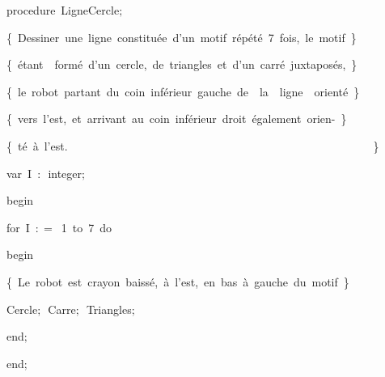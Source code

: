 {\pagebreak[3] 
\vspace{\neglskip}\mbox{\blc  \blk\idt  \mcl procedure\idt \ LigneCercle$;$}\par 
\vspace{\neglskip}\mbox{\blc  \blk\idt  \cmt  \{\ Dessiner\ une\ ligne\ constitu\'{e}e\ d{'}un\ motif\ r\'{e}p\'{e}t\'{e}\ 7\ fois,\ le\ motif\ \}\idt }\par 
\vspace{\neglskip}\mbox{\blc  \blk\idt  \cmt  \{\ \'{e}tant\ \ form\'{e}\ d{'}un\ cercle,\ de\ triangles\ et\ d{'}un\ carr\'{e}\ juxtapos\'{e}s,\ \}\idt }\par 
\vspace{\neglskip}\mbox{\blc  \blk\idt  \cmt  \{\ le\ robot\ partant\ du\ coin\ inf\'{e}rieur\ gauche\ de\ \ la\ \ ligne\ \ orient\'{e}\ \}\idt }\par 
\vspace{\neglskip}\mbox{\blc  \blk\idt  \cmt  \{\ vers\ l{'}est,\ et\ arrivant\ au\ coin\ inf\'{e}rieur\ droit\ \'{e}galement\ orien-\ \}\idt }\par 
\vspace{\neglskip}\mbox{\blc  \blk\idt  \cmt  \{\ t\'{e}\ \`{a}\ l{'}est.\ \ \ \ \ \ \ \ \ \ \ \ \ \ \ \ \ \ \ \ \ \ \ \ \ \ \ \ \ \ \ \ \ \ \ \ \ \ \ \ \ \ \ \ \ \ \ \ \ \ \ \ \ \ \}\idt }\par 
\pagebreak[3] 
\vspace{\neglskip}\mbox{\blc  \blk\blk\idt  \mcl var\idt \ I\ $:$\ integer$;$}\par 
\vspace{\neglskip}\mbox{\blc  \blk\idt  \mcl begin\idt }\par 
\pagebreak[3] 
\vspace{\neglskip}\mbox{\blc  \blk\blk\idt  \mcl for\idt \ I\ $:$$=$\ 1\ \mcl to\idt \ 7\ \mcl do\idt }\par 
\vspace{\neglskip}\mbox{\blc  \blk\blk\blk\idt  \mcl begin\idt \ }\par 
\vspace{\neglskip}\mbox{\blc  \blk\blk\blk\idt  \cmt  \{\ Le\ robot\ est\ crayon\ baiss\'{e},\ \`{a}\ l{'}est,\ en\ bas\ \`{a}\ gauche\ du\ motif\ \}\idt }\par 
\vspace{\neglskip}\mbox{\blc  \blk\blk\blk\blk\idt  Cercle$;$\ Carre$;$\ Triangles$;$\ }\par 
\vspace{\neglskip}\mbox{\blc  \blk\blk\blk\idt  \mcl end\idt $;$}\par 
\vspace{\neglskip}\mbox{\blc  \blk\idt  \mcl end\idt $;$}\par 
\medskip

}
